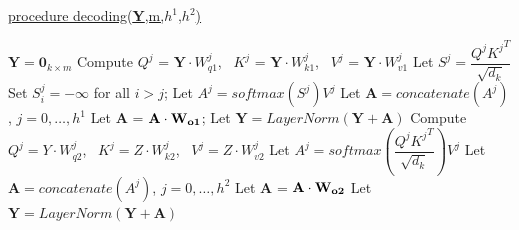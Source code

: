 \documentclass[algorithms,article,submit,pdftex,moreauthors]{Definitions/mdpi}
\begin{document}
\begin{algorithm2e} 

        \underline{procedure decoding({\bf Y},m,$h^1$,$h^2$)} 
        
        
        \label{dec:start}
        $\textbf{Y} = \textbf{0}_{k \times m}$ \; \label{dec:output}
	{       \label{dec:outer}
            {	\label{dec:decblock1}
                {   \label{dec:self1}
                    Compute $Q^j$ = $\textbf{Y}\cdot W_{q1}^j$,  \, 
                            $K^j$ = $\textbf{Y}\cdot W_{k1}^j$,  \, 
                            $V^j$ = $\textbf{Y}\cdot W_{v1}^j$   \;
                            \label{dec:selfproj}
                    Let $S^j = \dfrac{Q^j{K^j}^T}{\sqrt{d_k}}$\; \label{dec:scaled1}
                    Set $S_i^j=-\infty$ for all $i>j$; 
                    \label{dec:masking}
                    Let $A^j = softmax\left(S^j\right)V^j$
                    \label{dec:softmax}
                }   \label{dec:self2}
                Let $\textbf{A}=concatenate(A^j)$, $j=0,\dots,h^1$\; \label{dec:concatenation1}
                Let {\bf A} = ${\bf A \cdot W_{o1}}$;  \label{dec:outproject1}
                Let $\textbf{Y} = LayerNorm(\textbf{Y} + \textbf{A})$\; \label{dec:norm1}
                {   \label{dec:cross1}
                    Compute $Q^j=Y\cdot W_{q2}^j$, \,
                            $K^j=Z\cdot W_{k2}^j$, \, 
                            $V^j=Z\cdot W_{v2}^j$\;
                    \label{dec:crossproj}
                    Let $A^{j} = softmax\left(\dfrac{Q^j{K^j}^T}{\sqrt{d_k}}\right)V^j$\;
                    \label{dec:scaled2}
                }   \label{dec:cross2}
                Let $\textbf{A}=concatenate(A^j)$, $j=0,\dots,h^2$\;
                \label{dec:concatenation2}
                Let {\bf A} = ${\bf A \cdot W_{o2}}$\;
                \label{dec:outproject2}
                Let $\textbf{Y} = LayerNorm(\textbf{Y} + \textbf{A})$\;
}}
\end{algorithm2e}
\end{document}
